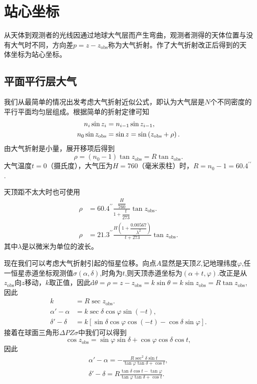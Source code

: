 \documentclass[11pt, a4paper, oneside]{ctexart}
\numberwithin{equation}{subsection}
\begin{document}
\newpage
\section{站心坐标}
从天体到观测者的光线因通过地球大气层而产生弯曲，观测者测得的天体位置与没有大气时不同，方向差$p=z-z_{\text{obs}}$称为大气折射。作了大气折射改正后得到的天体坐标为站心坐标。

\subsection{平面平行层大气}
我们从最简单的情况出发考虑大气折射近似公式，即认为大气层是$N$个不同密度的平行平面均匀层组成。根据简单的折射定律可知
\begin{align}
n_i\sin z_i&=n_{i-1}\sin z_{i-1},\notag\\
n_0\sin z_{\text{obs}}&=\sin z=\sin\left(z_{\text{obs}}+\rho\right).\notag
\end{align}
由大气折射是小量，展开移项后得到
\begin{equation}
\rho=\left(n_0-1\right)\tan z_{\text{obs}}=R\tan z_{\text{obs}}.
\end{equation}
大气温度$t=0$（摄氏度），大气压为$H=760$（毫米汞柱）时，$R=n_0-1=60.4^{\prime\prime}$.

天顶距不太大时也可使用
\begin{align}
\rho&=60.4^{\prime\prime}\frac{\dfrac{H}{760}}{1+\dfrac{t}{273}}\tan z_{\text{obs}}.\\
\rho&=21.3^{\prime\prime}\frac{H\left(1+\dfrac{0.00567}{\lambda^2}\right)}{t+273}\tan z_{\text{obs}}.
\end{align}
其中$\lambda$是以微米为单位的波长。

现在我们可以考虑大气折射引起的恒星位移。向点$A$显然是天顶$Z$,记地理纬度$\varphi$,任一恒星赤道坐标观测值$\sigma\left(\alpha,\delta{}\right)$,时角为$t$,则天顶赤道坐标为$\left(\alpha+t,\varphi\right)$.改正是从$z_{\text{obs}}$向$z$移动，$k$取正值，因此$\mathrm{d}\theta=\rho=z-z_{\text{obs}}=k\sin\theta=k\sin z_{\text{obs}}=R\tan z_{\text{obs}}$,因此
\begin{align}
k&=R\sec z_{\text{obs}}.\\
\alpha'-\alpha&=k\sec\delta\cos\varphi\sin\left(-t\right),\\
\delta'-\delta&=k\left[\sin\delta\cos\varphi\cos\left(-t\right)-\cos\delta\sin\varphi\right].
\end{align}
接着在球面三角形$\Delta{}PZ\sigma$中我们可以得到
\begin{equation}
\cos z_{\text{obs}}=\sin\varphi\sin\delta+\cos\varphi\cos\delta\cos t,
\end{equation}
因此
\begin{align}
\alpha'-\alpha=-\frac{R\sec^2\delta\sin t}{\tan\varphi\tan\delta+\cos t},\\
\delta'-\delta=R\frac{\tan\delta\cos t-\tan\varphi}{\tan\varphi\tan\delta+\cos t}.
\end{align}
\end{document}
